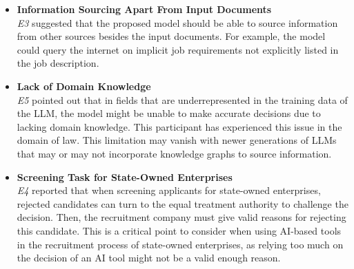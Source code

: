 \documentclass[draft,final]{thesisclass} %
\begin{document}
\begin{enumerate}
\begin{itemize}
        \item \textbf{Information Sourcing Apart From Input Documents}\\
        \textit{E3} suggested that the proposed model should be able to source information from other sources besides the input documents.
        For example, the model could query the internet on implicit job requirements not explicitly listed in the job description.
        \item \textbf{Lack of Domain Knowledge}\\
        \textit{E5} pointed out that in fields that are underrepresented in the training data of the \gls{LLM}, the model might be unable to make accurate decisions due to lacking domain knowledge. This participant has experienced this issue in the domain of law. This limitation may vanish with newer generations of \gls{LLM}s that may or may not incorporate knowledge graphs to source information.
        \item \textbf{Screening Task for State-Owned Enterprises}\\
        \textit{E4} reported that when screening applicants for state-owned enterprises, rejected candidates can turn to the equal treatment authority to challenge the decision. Then, the recruitment company must give valid reasons for rejecting this candidate. This is a critical point to consider when using \acs{AI}-based tools in the recruitment process of state-owned enterprises, as relying too much on the decision of an \acs{AI} tool might not be a valid enough reason.
    \end{itemize}
\end{enumerate}
\end{document}
